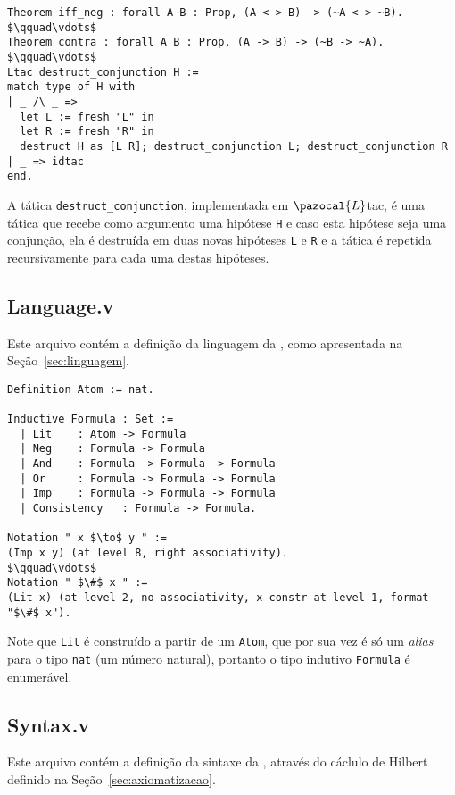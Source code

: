       \begin{lstlisting}[name=Utils, frame=single, language=coq]
Theorem iff_neg : forall A B : Prop, (A <-> B) -> (~A <-> ~B).
$\qquad\vdots$
Theorem contra : forall A B : Prop, (A -> B) -> (~B -> ~A).
$\qquad\vdots$
Ltac destruct_conjunction H :=
match type of H with
| _ /\ _ => 
  let L := fresh "L" in
  let R := fresh "R" in
  destruct H as [L R]; destruct_conjunction L; destruct_conjunction R
| _ => idtac
end.
      \end{lstlisting}

      A tática \texttt{destruct\_conjunction}, implementada em $\pazocal{L}$tac, é uma tática que recebe como argumento uma hipótese \texttt{H} e caso esta hipótese seja uma conjunção, ela é destruída em duas novas hipóteses \texttt{L} e \texttt{R} e a tática é repetida recursivamente para cada uma destas hipóteses.

      \subsection{Language.v}\label{sec:language}

      Este arquivo contém a definição da linguagem da \lfium{}, como apresentada na Seção~\ref{sec:linguagem}.

      \begin{lstlisting}[name=Language, frame=single, language=coq]
Definition Atom := nat.

Inductive Formula : Set :=
  | Lit    : Atom -> Formula
  | Neg    : Formula -> Formula
  | And    : Formula -> Formula -> Formula
  | Or     : Formula -> Formula -> Formula
  | Imp    : Formula -> Formula -> Formula
  | Consistency   : Formula -> Formula.

Notation " x $\to$ y " := 
(Imp x y) (at level 8, right associativity).
$\qquad\vdots$
Notation " $\#$ x " :=
(Lit x) (at level 2, no associativity, x constr at level 1, format "$\#$ x").
      \end{lstlisting}
      
      Note que \texttt{Lit} é construído a partir de um \texttt{Atom}, que por sua vez é só um \textit{alias} para o tipo \texttt{nat} (um número natural), portanto o tipo indutivo \texttt{Formula} é enumerável.

    \subsection{Syntax.v}\label{sec:syntax}

      Este arquivo contém a definição da sintaxe da \lfium{}, através do cáclulo de Hilbert definido na Seção~\ref{sec:axiomatizacao}.

